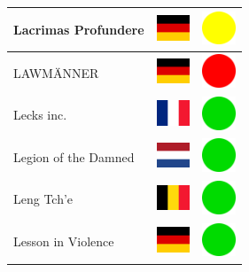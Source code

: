 \documentclass[12pt, a4paper, twoside]{report}
\begin{document}
\begin{center}
\begin{longtable}{|p{5cm}|p{2cm}|p{2cm}|}
Lacrimas Profundere & \includegraphics[width=1cm]{4x3/de} & \includegraphics[width=1cm]{likes/m} \\ \hline
LAWMÄNNER & \includegraphics[width=1cm]{4x3/de} & \includegraphics[width=1cm]{likes/n} \\ \hline
Lecks inc. & \includegraphics[width=1cm]{4x3/fr} & \includegraphics[width=1cm]{likes/y} \\ \hline
Legion of the Damned & \includegraphics[width=1cm]{4x3/nl} & \includegraphics[width=1cm]{likes/y} \\ \hline
Leng Tch'e & \includegraphics[width=1cm]{4x3/be} & \includegraphics[width=1cm]{likes/y} \\ \hline
Lesson in Violence & \includegraphics[width=1cm]{4x3/de} & \includegraphics[width=1cm]{likes/y} \\ \hline

\end{longtable}
\end{center}
\end{document}
